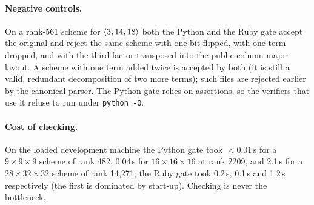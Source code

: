 \paragraph{Negative controls.}
On a rank-561 scheme for $\langle 3,14,18\rangle$ both the Python and the Ruby gate accept the original and reject the same scheme with one bit flipped,
with one term dropped, and with the third factor transposed into the public column-major layout. A scheme with one term added twice is
accepted by both (it is still a valid, redundant decomposition of two more terms); such files are rejected earlier by the canonical parser.
The Python gate relies on assertions, so the verifiers that use it refuse to run under \texttt{python -O}.

\paragraph{Cost of checking.}
On the loaded development machine the Python gate took $<0.01$\,s for a $9\times9\times9$ scheme of rank 482, 0.04\,s for
$16\times16\times16$ at rank 2209, and 2.1\,s for a $28\times32\times32$ scheme of rank 14{,}271; the Ruby gate took 0.2\,s, 0.1\,s and 1.2\,s
respectively (the first is dominated by start-up). Checking is never the bottleneck.
